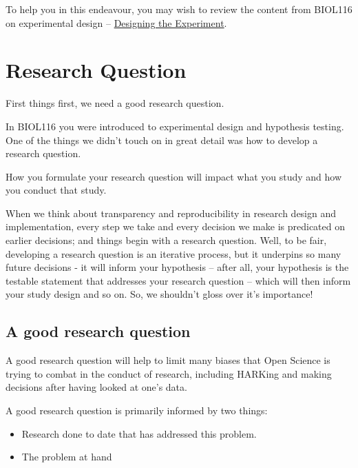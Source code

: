 \documentclass[
]{book}
\providecommand{\tightlist}{%
  \setlength{\itemsep}{0pt}\setlength{\parskip}{0pt}}
\begin{document}
To help you in this endeavour, you may wish to review the content from BIOL116 on experimental design -- \href{https://ubco-biology.github.io/BIOL-116-Lab-Manual/designing-the-experiment.html}{Designing the Experiment}.

\hypertarget{research-question}{%
\chapter*{Research Question}\label{research-question}}

First things first, we need a good research question.

In BIOL116 you were introduced to experimental design and hypothesis testing. One of the things we didn't touch on in great detail was how to develop a research question.

How you formulate your research question will impact what you study and how you conduct that study.

When we think about transparency and reproducibility in research design and implementation, every step we take and every decision we make is predicated on earlier decisions; and things begin with a research question. Well, to be fair, developing a research question is an iterative process, but it underpins so many future decisions - it will inform your hypothesis -- after all, your hypothesis is the testable statement that addresses your research question -- which will then inform your study design and so on. So, we shouldn't gloss over it's importance!

\hypertarget{a-good-research-question}{%
\section*{A good research question}\label{a-good-research-question}}

A good research question will help to limit many biases that Open Science is trying to combat in the conduct of research, including HARKing and making decisions after having looked at one's data.

A good research question is primarily informed by two things:

\begin{itemize}
\tightlist
\item
  Research done to date that has addressed this problem.
\item
  The problem at hand
\end{itemize}
\end{document}
